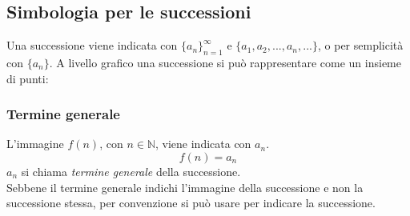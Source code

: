 \documentclass[a4paper,12pt, oneside]{book}
\begin{document}
\subsection{Simbologia per le successioni} Una successione viene indicata con
$\{a_n\}_{n=1}^{\infty}$ e $\{ a_1, a_2, ..., a_n, ... \}$, o per semplicità con
$\{a_n\}$. A livello grafico una successione si può rappresentare come un
insieme di punti:
\begin{center}
\end{center}
\subsubsection{Termine generale} L'immagine $f(n)$, con $n \in \mathbb{N}$,
viene indicata con $a_n$.
\begin{equation} f(n) = a_n
\end{equation} $a_n$ si chiama \emph{termine generale} della successione.\\
Sebbene il termine generale indichi l'immagine della successione e non la
successione stessa, per convenzione si può usare per indicare la successione.
\end{document}
